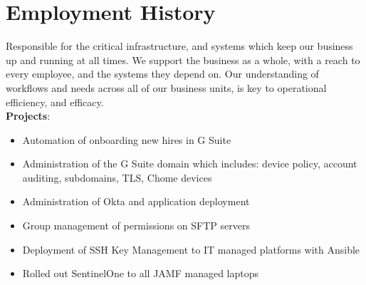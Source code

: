 \documentclass[letter,sans]{moderncv}
\begin{document}
\maketitle

\vspace{-0.6in}

\section{Employment History}

{Responsible for the critical infrastructure, and systems which keep our business up and running at all times. We support the business as a whole, with a reach to every employee, and the systems they depend on. Our understanding of workflows and needs across all of our business units, is key to operational efficiency, and efficacy.\\
  \textbf{Projects}:
  \begin{itemize}
  \item Automation of onboarding new hires in G Suite
  \item Administration of the G Suite domain which includes: device policy, account auditing, subdomains, TLS, Chome devices
  \item Administration of Okta and application deployment
  \item Group management of permissions on SFTP servers
  \item Deployment of SSH Key Management to IT managed platforms with Ansible
  \item Rolled out SentinelOne to all JAMF managed laptops
  \end{itemize}
}
\end{document}
